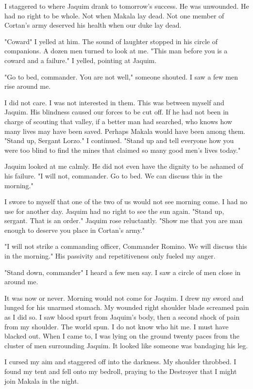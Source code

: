 \documentclass{article}
\begin{document}
I staggered to where Jaquim drank to tomorrow's success. He was unwounded. He had no right to be whole. Not when Makala lay dead. Not one member of Cortan's army deserved his health when our duke lay dead. 

"Coward" I yelled at him. The sound of laughter stopped in his circle of companions. A dozen men turned to look at me. "This man before you is a coward and a failure." I yelled, pointing at Jaquim. 

"Go to bed, commander. You are not well," someone shouted. I saw a few men rise around me. 

I did not care. I was not interested in them. This was between myself and Jaquim. His blindness caused our forces to be cut off. If he had not been in charge of scouting that valley, if a better man had searched, who knows how many lives may have been saved. Perhaps Makala would have been among them. "Stand up, Sergant Lorzo." I continued. "Stand up and tell everyone how you were too blind to find the mines that claimed so many good men's lives today."

Jaquim looked at me calmly. He did not even have the dignity to be ashamed of his failure. "I will not, commander. Go to bed. We can discuss this in the morning."

I swore to myself that one of the two of us would not see morning come. I had no use for another day. Jaquim had no right to see the sun again. "Stand up, sergant. That is an order." Jaquim rose reluctantly. "Show me that you are man enough to deserve you place in Cortan's army."

"I will not strike a commanding officer, Commander Romino. We will discuss this in the morning." His passivity and repetitiveness only fueled my anger.

"Stand down, commander" I heard a few men say. I saw a circle of men close in around me. 

It was now or never. Morning would not come for Jaquim. I drew my sword and lunged for his unarmed stomach. My wounded right shoulder blade screamed pain as I did so. I saw blood spurt from Jaquim's body, then a second shock of pain from my shoulder. The world spun. I do not know who hit me. I must have blacked out. When I came to, I was lying on the ground twenty paces from the cluster of men surrounding Jaquim. It looked like someone was bandaging his leg.

I cursed my aim and staggered off into the darkness. My shoulder throbbed. I found my tent and fell onto my bedroll, praying to the Destroyer that I might join Makala in the night.
\end{document}
